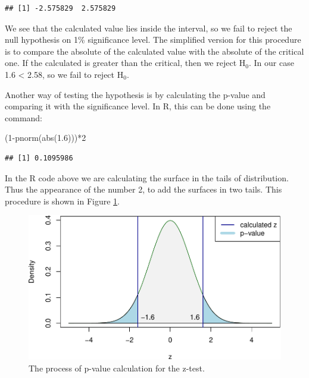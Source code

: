 \documentclass[
]{book}
\newenvironment{Shaded}{\begin{snugshade}}{\end{snugshade}}
\newcommand{\DecValTok}[1]{\textcolor[rgb]{0.00,0.00,0.81}{#1}}
\newcommand{\FloatTok}[1]{\textcolor[rgb]{0.00,0.00,0.81}{#1}}
\newcommand{\FunctionTok}[1]{\textcolor[rgb]{0.00,0.00,0.00}{#1}}
\newcommand{\NormalTok}[1]{#1}
\newcommand{\SpecialCharTok}[1]{\textcolor[rgb]{0.00,0.00,0.00}{#1}}
\theoremstyle{definition}
\theoremstyle{definition}
\theoremstyle{definition}
\theoremstyle{definition}
\theoremstyle{remark}
\begin{document}
\begin{verbatim}
## [1] -2.575829  2.575829
\end{verbatim}

We see that the calculated value lies inside the interval, so we fail to reject the null hypothesis on 1\% significance level. The simplified version for this procedure is to compare the absolute of the calculated value with the absolute of the critical one. If the calculated is greater than the critical, then we reject H\(_0\). In our case 1.6 \textless{} 2.58, so we fail to reject H\(_0\).

Another way of testing the hypothesis is by calculating the p-value and comparing it with the significance level. In R, this can be done using the command:

\begin{Shaded}
\begin{Highlighting}[]
\NormalTok{(}\DecValTok{1}\SpecialCharTok{{-}}\FunctionTok{pnorm}\NormalTok{(}\FunctionTok{abs}\NormalTok{(}\FloatTok{1.6}\NormalTok{)))}\SpecialCharTok{*}\DecValTok{2}
\end{Highlighting}
\end{Shaded}

\begin{verbatim}
## [1] 0.1095986
\end{verbatim}

In the R code above we are calculating the surface in the tails of distribution. Thus the appearance of the number 2, to add the surfaces in two tails. This procedure is shown in Figure \ref{fig:hypothesisTestingZTestPvalue}.

\begin{figure}
\centering
\includegraphics{Svetunkov---Statistics-for-Business-Analytics_files/figure-latex/hypothesisTestingZTestPvalue-1.pdf}
\caption{\label{fig:hypothesisTestingZTestPvalue}The process of p-value calculation for the z-test.}
\end{figure}
\end{document}
